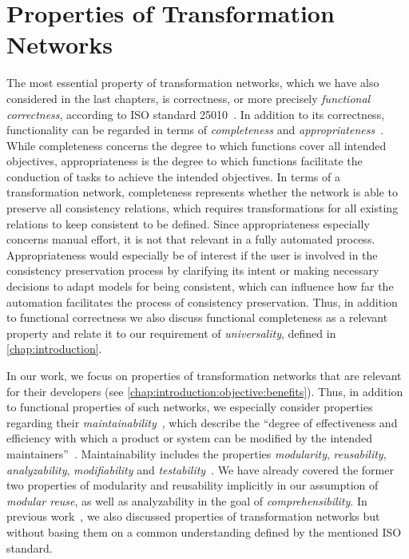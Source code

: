 \section{Properties of Transformation Networks}
\label{chap:classification:properties}

The most essential property of transformation networks, which we have also considered in the last chapters, is correctness, or more precisely \emph{functional correctness}, according to ISO standard 25010~\cite[p.~11]{iso25010}.
In addition to its correctness, functionality can be regarded in terms of \emph{completeness} and \emph{appropriateness}~\cite[p.~11]{iso25010}.
While completeness concerns the degree to which functions cover all intended objectives, appropriateness is the degree to which functions facilitate the conduction of tasks to achieve the intended objectives.
In terms of a transformation network, completeness represents whether the network is able to preserve all consistency relations, which requires transformations for all existing relations to keep consistent to be defined.
Since appropriateness especially concerns manual effort, it is not that relevant in a fully automated process. Appropriateness would especially be of interest if the user is involved in the consistency preservation process by clarifying its intent or making necessary decisions to adapt models for being consistent, which can influence how far the automation facilitates the process of consistency preservation.
Thus, in addition to functional correctness we also discuss functional completeness as a relevant property and relate it to our requirement of \emph{universality}, defined in \autoref{chap:introduction}.

In our work, we focus on properties of transformation networks that are relevant for their developers (see \autoref{chap:introduction:objective:benefits}).
Thus, in addition to functional properties of such networks, we especially consider properties regarding their \emph{maintainability}~\cite[Tab.~2]{iso25010}, which describe the \enquote{degree of effectiveness and efficiency with which a product or system can be modified by the intended maintainers}~\cite[p.~14]{iso25010}.
Maintainability includes the properties \emph{modularity}, \emph{reusability}, \emph{analyzability}, \emph{modifiability} and \emph{testability}~\cite[pp.~14]{iso25010}.
We have already covered the former two properties of modularity and reusability implicitly in our assumption of \emph{modular reuse}, as well as analyzability in the goal of \emph{comprehensibility}.
In previous work~, we also discussed properties of transformation networks but without basing them on a common understanding defined by the mentioned ISO standard.


